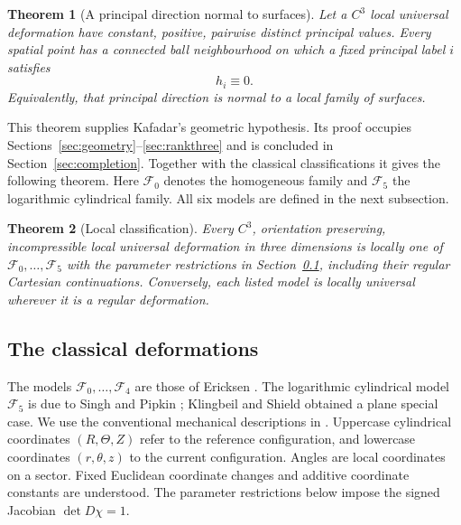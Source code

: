 \documentclass[11pt,a4paper]{article}
\numberwithin{equation}{section}
\theoremstyle{plain}
\newtheorem{theorem}{Theorem}[section]
\theoremstyle{definition}
\theoremstyle{remark}
\begin{document}
\begin{theorem}[A principal direction normal to surfaces]
\label{completion:zerocontact}
Let a $C^3$ local universal deformation have constant, positive,
pairwise distinct principal values. Every spatial point has a connected
ball neighbourhood on which a fixed principal label $i$ satisfies
\[
 h_i\equiv0.
\]
Equivalently, that principal direction is normal to a local family of
surfaces.
\end{theorem}

This theorem supplies Kafadar's geometric hypothesis. Its proof occupies
Sections~\ref{sec:geometry}--\ref{sec:rankthree} and is concluded in
Section~\ref{sec:completion}. Together with the classical classifications
it gives the following theorem. Here $\mathcal F_0$ denotes the
homogeneous family and $\mathcal F_5$ the logarithmic cylindrical
family. All six models are defined in the next subsection.

\begin{theorem}[Local classification]\label{intro:main}
Every $C^3$, orientation preserving, incompressible local universal
deformation in three dimensions is locally one of
$\mathcal F_0,\ldots,\mathcal F_5$ with the parameter restrictions in
Section~\ref{sec:classicalmodels}, including their regular Cartesian
continuations. Conversely, each
listed model is locally universal wherever it is a regular deformation.
\end{theorem}

\subsection{The classical deformations}\label{sec:classicalmodels}

The models $\mathcal F_0,\ldots,\mathcal F_4$ are those of Ericksen
\cite{Ericksen1954}. The logarithmic cylindrical model $\mathcal F_5$
is due to Singh and Pipkin \cite{SinghPipkin1965}; Klingbeil and Shield
\cite{KlingbeilShield1966} obtained a plane special case.
We use the conventional mechanical descriptions in
\cite[\S1]{YavariGoriely2023}. Uppercase cylindrical coordinates $(R,\Theta,Z)$ refer to
the reference configuration, and lowercase coordinates $(r,\theta,z)$ to
the current configuration. Angles are local coordinates on a sector.
Fixed Euclidean coordinate changes and additive coordinate constants are
understood. The parameter restrictions below impose the signed Jacobian
$\det D\chi=1$.
\end{document}

